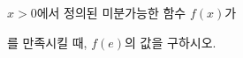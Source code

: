 \hspace*{2mm}\begin{minipage}[t]{\dimexpr\linewidth-2mm\relax}\vspace{0pt}
$x>0$에서 정의된 미분가능한 함수 $f(x)$가 \par\smallskip{}\par\smallskip\noindent 를 만족시킬 때, $f(e)$의 값을 구하시오.\end{minipage}
